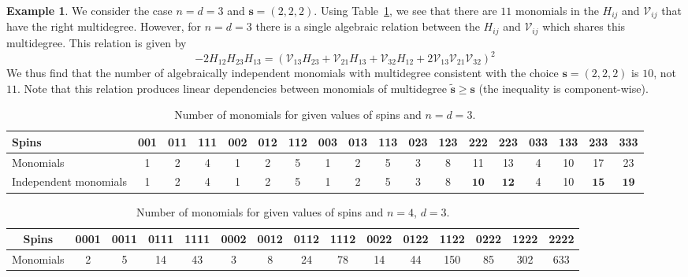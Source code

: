 \documentclass[12pt,a4paper]{extarticle}
\theoremstyle{definition}
\newtheorem{example}[theorem]{Example}
\begin{document}
\begin{example} \label{ex:11to10}
    We consider the case $n=d=3$ and $\mathbf{s}=(2,2,2)$. Using Table~\ref{table:n3}, we see that there are $11$ monomials in the $H_{ij}$ and $\mathcal{V}_{ij}$ that have the right multidegree. However, for $n=d=3$ there is a single algebraic relation between the $H_{ij}$ and $\mathcal{V}_{ij}$ which shares this multidegree. This relation is given by
    \begin{equation}
        -2H_{12}H_{23}H_{13}=(\mathcal{V}_{13}H_{23}+\mathcal{V}_{21}H_{13}+\mathcal{V}_{32}H_{12}+2\mathcal{V}_{13}\mathcal{V}_{21}\mathcal{V}_{32})^2
    \end{equation}
    We thus find that the number of algebraically independent monomials with multidegree consistent with the choice $\mathbf{s}=(2,2,2)$ is $10$, not $11$. Note that this relation produces linear dependencies between monomials of multidegree $\tilde{\mathbf{s}}\geq \mathbf{s}$ (the inequality is component-wise).  
\end{example}

\begin{table}[h]
\centering
\small
\setlength{\tabcolsep}{3.5pt}
\renewcommand{\arraystretch}{1.2}

\begin{tabular}{|p{2cm}|c|c|c|c|c|c|c|c|c|c|c|c|c|c|c|c|c|}
\hline
Spins
& 001 & 011 & 111
& 002 & 012 & 112
& 003 & 013 & 113
& 023 & 123 & 222 & 223
& 033 & 133 & 233 & 333 \\
\hline
Monomials
& 1 & 2 & 4
& 1 & 2 & 5
& 1 & 2 & 5
& 3 & 8 &11 & 13
& 4 & 10 & 17 & 23 \\
\hline
Independent monomials& 1 & 2 & 4
& 1 & 2 & 5
& 1 & 2 & 5
& 3 & 8 & $\mathbf{10}$
& $\mathbf{12}$ & 4 & 10 & $\mathbf{15}$ & $\mathbf{19}$
\\
\hline
\end{tabular}

\caption{Number of monomials for given values of spins and $n=d=3$.} \label{table:n3}
\end{table}

\begin{table}[h]
\centering
\small
\setlength{\tabcolsep}{3.5pt} 
\renewcommand{\arraystretch}{1.2}
\begin{tabular}{|c|c|c|c|c|c|c|c|c|c|c|c|c|c|c|}
\hline
Spins 
& 0001 & 0011 & 0111 & 1111 
& 0002 & 0012 & 0112 & 1112 
& 0022 & 0122 & 1122 & 0222 & 1222 & 2222 \\
\hline
Monomials
& 2 & 5 & 14 & 43
& 3 & 8 & 24 & 78
& 14 & 44 & 150 & 85 & 302 & 633 \\
\hline
\end{tabular}
\caption{Number of monomials for given values of spins and $n=4$, $d=3$.}\label{table:n4}
\end{table}
\end{document}
